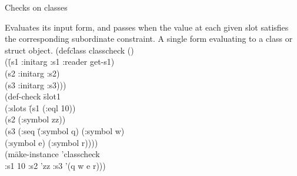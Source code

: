 \begin{criteriaGroup}{Checks on classes}

{Evaluates its input form, and passes when the value at each given
slot satisfies the corresponding subordinate constraint.}
{A single form evaluating to a class or struct object.}
{}
{\tabbingEx}{
(defc\=lass classcheck ()
\\ \> (\=(s1 :initarg :s1 :reader get-s1)
\\ \> \> (s2 :initarg :s2)
\\ \> \> (s3 :initarg :s3)))
\\ (def-check \=slot1
\\ \>  (:slots \=(s1 (:eql 10))
\\ \>  \>(s2 (:symbol zz))
\\ \>  \>(s3 (:seq \=(:symbol q) (:symbol w)
\\ \>  \> \> (:symbol e) (:symbol r))))
\\ \>  (m\=ake-instance 'classcheck
\\ \> \>  :s1 10 :s2 'zz :s3 '(q w e r)))
}

\end{criteriaGroup}
